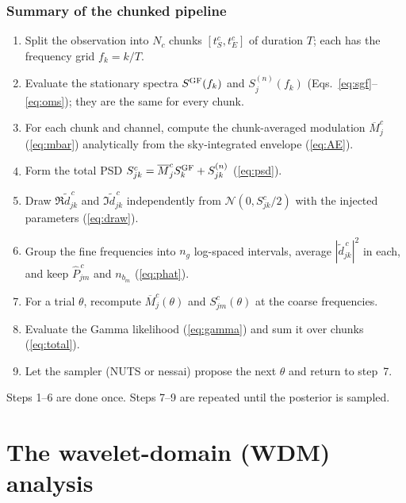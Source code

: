 \documentclass[11pt,a4paper]{article}
\newcommand{\Pbar}{\hat{P}}
\newcommand{\Mbar}{\overline{M}}
\begin{document}
\section{Summary of the chunked pipeline}

\begin{keybox}
\begin{enumerate}
  \item Split the observation into $N_c$ chunks $[t^c_S,t^c_E]$ of duration $T$;
        each has the frequency grid $f_k=k/T$.
  \item Evaluate the stationary spectra $S^{\rm GF}(f_k)$ and $S^{(n)}_j(f_k)$
        (Eqs.~\ref{eq:sgf}--\ref{eq:oms}); they are the same for every chunk.
  \item For each chunk and channel, compute the chunk-averaged modulation
        $\Mbar^c_j$ (\cref{eq:mbar}) analytically from the sky-integrated envelope
        (\cref{eq:AE}).
  \item Form the total PSD $S^c_{jk}=\Mbar^c_jS^{\rm GF}_k+S^{(n)}_{jk}$ (\cref{eq:psd}).
  \item Draw $\Re\tilde d^{\,c}_{jk}$ and $\Im\tilde d^{\,c}_{jk}$ independently from
        $\mathcal{N}(0,S^c_{jk}/2)$ with the injected parameters (\cref{eq:draw}).
  \item Group the fine frequencies into $n_g$ log-spaced intervals, average
        $|\tilde d^{\,c}_{jk}|^2$ in each, and keep $\Pbar^{\,c}_{jm}$ and
        $n_{b_m}$ (\cref{eq:phat}).
  \item For a trial $\theta$, recompute $\Mbar^c_j(\theta)$ and $S^c_{jm}(\theta)$ at
        the coarse frequencies.
  \item Evaluate the Gamma likelihood (\cref{eq:gamma}) and sum it over chunks
        (\cref{eq:total}).
  \item Let the sampler (NUTS or nessai) propose the next $\theta$ and return to
        step~7.
\end{enumerate}
Steps 1--6 are done once. Steps 7--9 are repeated until the posterior is sampled.
\end{keybox}

\part{The wavelet-domain (WDM) analysis}
\end{document}
